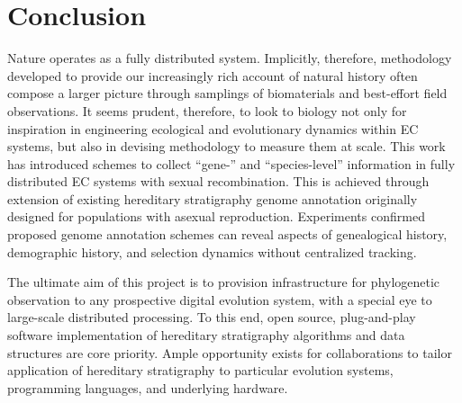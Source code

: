 \section{Conclusion} \label{sec:conclusion}

Nature operates as a fully distributed system.
Implicitly, therefore, methodology developed to provide our increasingly rich account of natural history often compose a larger picture through samplings of biomaterials and best-effort field observations.
It seems prudent, therefore, to look to biology not only for inspiration in engineering ecological and evolutionary dynamics within EC systems, but also in devising methodology to measure them at scale.
This work has introduced schemes to collect ``gene-'' and ``species-level'' information in fully distributed EC systems with sexual recombination.
This is achieved through extension of existing hereditary stratigraphy genome annotation originally designed for populations with asexual reproduction.
Experiments confirmed proposed genome annotation schemes can reveal aspects of genealogical history, demographic history, and selection dynamics without centralized tracking.

The ultimate aim of this project is to provision infrastructure for phylogenetic observation to any prospective digital evolution system, with a special eye to large-scale distributed processing.
To this end, open source, plug-and-play software implementation of hereditary stratigraphy algorithms and data structures are core priority.
Ample opportunity exists for collaborations to tailor application of hereditary stratigraphy to particular evolution systems, programming languages, and underlying hardware.
